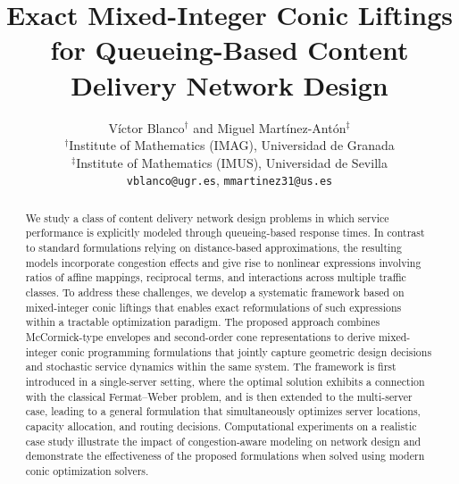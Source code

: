 \documentclass[a4paper,11pt,reqno]{amsart}
\let\origmaketitle\maketitle
\def\maketitle{
	\begingroup
	\def\uppercasenonmath##1{} %
	\let\MakeUppercase\relax %
	\origmaketitle
	\endgroup
}
\begin{document}
\title[Exact Mixed-Integer Conic Liftings for Queueing-Based CDN Design]{\Large Exact Mixed-Integer Conic Liftings for Queueing-Based Content Delivery Network Design}

\author[V. Blanco and M. Mart\'inez-Ant\'on]{
{\large V\'ictor Blanco$^{\dagger}$ and Miguel Mart\'inez-Ant\'on$^{\ddagger}$}\bigskip\\
\small $^\dagger$Institute of Mathematics (IMAG), Universidad de Granada\\
\small $^\ddagger$Institute of Mathematics (IMUS), Universidad de Sevilla\bigskip\\
\small \texttt{vblanco@ugr.es}, \texttt{mmartinez31@us.es}
}

\maketitle


\begin{abstract}
We study a class of content delivery network design problems in which service performance is explicitly modeled through queueing-based response times. In contrast to standard formulations relying on distance-based approximations, the resulting models incorporate congestion effects and give rise to nonlinear expressions involving ratios of affine mappings, reciprocal terms, and interactions across multiple traffic classes. To address these challenges, we develop a systematic framework based on mixed-integer conic liftings that enables exact reformulations of such expressions within a tractable optimization paradigm. The proposed approach combines McCormick-type envelopes and second-order cone representations to derive mixed-integer conic programming formulations that jointly capture geometric design decisions and stochastic service dynamics within the same system. The framework is first introduced in a single-server setting, where the optimal solution exhibits a connection with the classical Fermat--Weber problem, and is then extended to the multi-server case, leading to a general formulation that simultaneously optimizes server locations, capacity allocation, and routing decisions. Computational experiments on a realistic case study illustrate the impact of congestion-aware modeling on network design and demonstrate the effectiveness of the proposed formulations when solved using modern conic optimization solvers.
\end{abstract}
 
\end{document}
